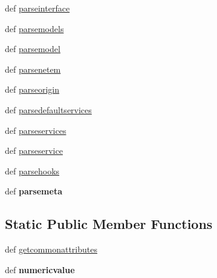 \begin{DoxyCompactItemize}
\item 
def \hyperlink{classcore_1_1misc_1_1xmlparser0_1_1_core_document_parser0_ad855ba20846b0693d5e66fa704fb2c1a}{parseinterface}
\item 
def \hyperlink{classcore_1_1misc_1_1xmlparser0_1_1_core_document_parser0_a41d40933d64f643af93c7c9072ea6fcb}{parsemodels}
\item 
def \hyperlink{classcore_1_1misc_1_1xmlparser0_1_1_core_document_parser0_a3d34d54f09b73f4c96401464d10c5ad3}{parsemodel}
\item 
def \hyperlink{classcore_1_1misc_1_1xmlparser0_1_1_core_document_parser0_a3c21aa662f8c3589acc6b7f3f6e39498}{parsenetem}
\item 
def \hyperlink{classcore_1_1misc_1_1xmlparser0_1_1_core_document_parser0_a1244183f18a820277cf6a9acf187b346}{parseorigin}
\item 
def \hyperlink{classcore_1_1misc_1_1xmlparser0_1_1_core_document_parser0_a5b308cd615acd3ebe24fae0fe5aca2b7}{parsedefaultservices}
\item 
def \hyperlink{classcore_1_1misc_1_1xmlparser0_1_1_core_document_parser0_abf487d5e30f98ab666ed606be1debe46}{parseservices}
\item 
def \hyperlink{classcore_1_1misc_1_1xmlparser0_1_1_core_document_parser0_a561bdaaf01e3c8a633ded14a0f3c9e93}{parseservice}
\item 
def \hyperlink{classcore_1_1misc_1_1xmlparser0_1_1_core_document_parser0_ab5246e7716adc32b91b31b3e2ddc34da}{parsehooks}
\item 
\hypertarget{classcore_1_1misc_1_1xmlparser0_1_1_core_document_parser0_ae2de0d3b2bf4ba5084fd89d517a85184}{def {\bfseries parsemeta}}\label{classcore_1_1misc_1_1xmlparser0_1_1_core_document_parser0_ae2de0d3b2bf4ba5084fd89d517a85184}

\end{DoxyCompactItemize}
\subsection*{Static Public Member Functions}
\begin{DoxyCompactItemize}
\item 
def \hyperlink{classcore_1_1misc_1_1xmlparser0_1_1_core_document_parser0_a0c7822132ad6b9e49e59de91b1535995}{getcommonattributes}
\item 
\hypertarget{classcore_1_1misc_1_1xmlparser0_1_1_core_document_parser0_a2ad93237f1e60ec8f3af3998e21d44d2}{def {\bfseries numericvalue}}\label{classcore_1_1misc_1_1xmlparser0_1_1_core_document_parser0_a2ad93237f1e60ec8f3af3998e21d44d2}

\end{DoxyCompactItemize}
